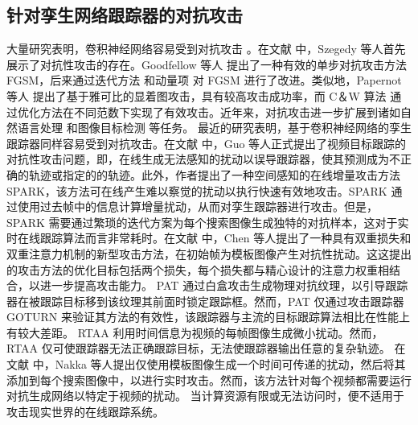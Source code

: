 \subsection{针对孪生网络跟踪器的对抗攻击}
大量研究表明，卷积神经网络容易受到对抗攻击 \cite{Deepsec}。在文献 \cite{intriguing} 中，Szegedy 等人首先展示了对抗性攻击的存在。Goodfellow 等人 \cite{FGSM} 提出了一种有效的单步对抗攻击方法 FGSM，后来通过迭代方法 \cite{kurakin2017adversarial} 和动量项 \cite{dong2018boosting} 对 FGSM 进行了改进。类似地，Papernot 等人 \cite{papernot2016limitations} 提出了基于雅可比的显着图攻击，具有较高攻击成功率，而 C＆W 算法 \cite{carlini2017towards} 通过优化方法在不同范数下实现了有效攻击。近年来，对抗攻击进一步扩展到诸如自然语言处理 \cite{generating} 和图像目标检测 \cite{wei2019transferable} 等任务。
最近的研究表明，基于卷积神经网络的孪生跟踪器同样容易受到对抗攻击。在文献 \cite{SPARK} 中，Guo 等人正式提出了视频目标跟踪的对抗性攻击问题，即，在线生成无法感知的扰动以误导跟踪器，使其预测成为不正确的轨迹或指定的的轨迹。此外，作者提出了一种空间感知的在线增量攻击方法 SPARK，该方法可在线产生难以察觉的扰动以执行快速有效地攻击。SPARK \cite{SPARK} 通过使用过去帧中的信息计算增量扰动，从而对孪生跟踪器进行攻击。但是，SPARK 需要通过繁琐的迭代方案为每个搜索图像生成独特的对抗样本，这对于实时在线跟踪算法而言非常耗时。在文献 \cite{chen2020one} 中，Chen 等人提出了一种具有双重损失和双重注意力机制的新型攻击方法，在初始帧为模板图像产生对抗性扰动。这这提出的攻击方法的优化目标包括两个损失，每个损失都与精心设计的注意力权重相结合，以进一步提高攻击能力。
PAT \cite{PAT} 通过白盒攻击生成物理对抗纹理，以引导跟踪器在被跟踪目标移到该纹理其前面时锁定跟踪框。然而，PAT 仅通过攻击跟踪器 GOTURN \cite{GOTURN} 来验证其方法的有效性，该跟踪器与主流的目标跟踪算法相比在性能上有较大差距。
RTAA \cite{RTAA} 利用时间信息为视频的每帧图像生成微小扰动。然而，RTAA 仅可使跟踪器无法正确跟踪目标，无法使跟踪器输出任意的复杂轨迹。
在文献 \cite{TTP} 中，Nakka 等人提出仅使用模板图像生成一个时间可传递的扰动，然后将其添加到每个搜索图像中，以进行实时攻击。然而，该方法针对每个视频都需要运行对抗生成网络以特定于视频的扰动。%
当计算资源有限或无法访问时，便不适用于攻击现实世界的在线跟踪系统。
